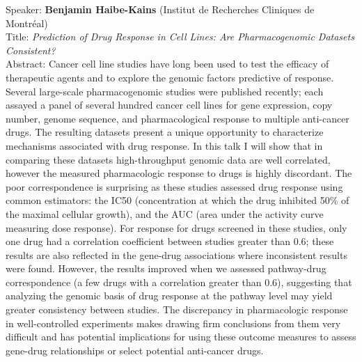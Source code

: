 \documentclass[11pt]{article}
\begin{document}
\bigskip
\noindent
Speaker: {\bf Benjamin Haibe-Kains} (Institut de Recherches Cliniques de Montréal)\\
Title: {\it Prediction of Drug Response in Cell Lines: Are Pharmacogenomic Datasets Consistent?}\\
Abstract: Cancer cell line studies have long been used to test the
efficacy of therapeutic agents and to explore the genomic factors
predictive of response. Several large-scale pharmacogenomic studies
were published recently; each assayed a panel of several hundred
cancer cell lines for gene expression, copy number, genome sequence,
and pharmacological response to multiple anti-cancer drugs. The
resulting datasets present a unique opportunity to characterize
mechanisms associated with drug response. In this talk I will show
that in comparing these datasets high-throughput genomic data are well
correlated, however the measured pharmacologic response to drugs is
highly discordant. The poor correspondence is surprising as these
studies assessed drug response using common estimators: the IC50
(concentration at which the drug inhibited 50\% of the maximal
cellular growth), and the AUC (area under the activity curve measuring
dose response). For response for drugs screened in these studies, only
one drug had a correlation coefficient between studies greater than
0.6; these results are also reflected in the gene-drug associations
where inconsistent results were found. However, the results improved
when we assessed pathway-drug correspondence (a few drugs with a
correlation greater than 0.6), suggesting that analyzing the genomic
basis of drug response at the pathway level may yield greater
consistency between studies. The discrepancy in pharmacologic response
in well-controlled experiments makes drawing firm conclusions from
them very difficult and has potential implications for using these
outcome measures to assess gene-drug relationships or select potential
anti-cancer drugs.
\end{document}
